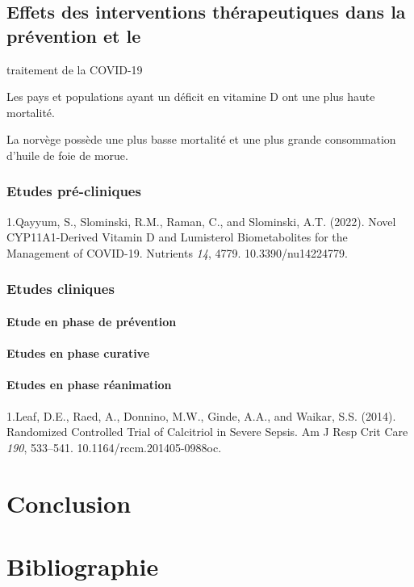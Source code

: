 \documentclass[
  a4paper,
  DIV=11,
  numbers=noendperiod,
  listof=totoc]{scrreprt}
\begin{document}
\section{Effets des interventions thérapeutiques dans la prévention et
le}\label{effets-des-interventions-thuxe9rapeutiques-dans-la-pruxe9vention-et-le}

traitement de la COVID-19

\textcite{Bishop.2021}

Les pays et populations ayant un déficit en vitamine D ont une plus
haute mortalité.

La norvège possède une plus basse mortalité et une plus grande
consommation d'huile de foie de morue.

\subsection{Etudes pré-cliniques}\label{etudes-pruxe9-cliniques}

1.Qayyum, S., Slominski, R.M., Raman, C., and Slominski, A.T. (2022).
Novel CYP11A1-Derived Vitamin D and Lumisterol Biometabolites for the
Management of COVID-19. Nutrients \emph{14}, 4779. 10.3390/nu14224779.

\subsection{Etudes cliniques}\label{etudes-cliniques}

\subsubsection{Etude en phase de
prévention}\label{etude-en-phase-de-pruxe9vention}

\subsubsection{Etudes en phase curative}\label{etudes-en-phase-curative}

\subsubsection{Etudes en phase
réanimation}\label{etudes-en-phase-ruxe9animation}

1.Leaf, D.E., Raed, A., Donnino, M.W., Ginde, A.A., and Waikar, S.S.
(2014). Randomized Controlled Trial of Calcitriol in Severe Sepsis. Am J
Resp Crit Care \emph{190}, 533--541. 10.1164/rccm.201405-0988oc.

\newpage{}

\chapter{Conclusion}\label{conclusion}

\newpage{}

\hypertarget{Bibliographie}{%
\chapter*{\centering Bibliographie}\label{Bibliographie}}
\singlespace

\printbibliography[heading=none]
\end{document}
